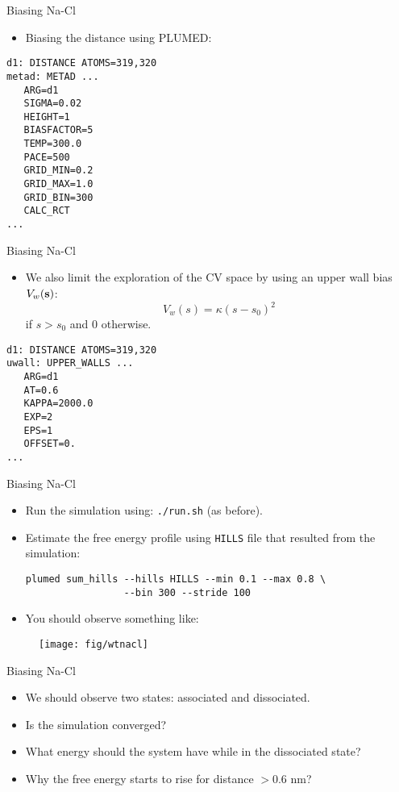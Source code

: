 \documentclass[10pt]{beamer}
\begin{document}
\begin{frame}[fragile]{Biasing Na-Cl}
\begin{itemize}
\setlength\itemsep{1em}
  \item Biasing the distance using PLUMED:
\end{itemize}
\begin{lstlisting}
d1: DISTANCE ATOMS=319,320
metad: METAD ...
   ARG=d1
   SIGMA=0.02
   HEIGHT=1
   BIASFACTOR=5
   TEMP=300.0
   PACE=500
   GRID_MIN=0.2
   GRID_MAX=1.0
   GRID_BIN=300
   CALC_RCT
...
\end{lstlisting}
\end{frame}

\begin{frame}[fragile]{Biasing Na-Cl}
\begin{itemize}
\setlength\itemsep{1em}
  \item We also limit the exploration of the CV space by using an upper wall bias $V_w({\bf s})$:
  \begin{equation}
    V_w(s)=\kappa(s-s_0)^2
  \end{equation}
  if $s>s_0$ and 0 otherwise.
\end{itemize}
\begin{lstlisting}
d1: DISTANCE ATOMS=319,320
uwall: UPPER_WALLS ...
   ARG=d1
   AT=0.6
   KAPPA=2000.0
   EXP=2
   EPS=1
   OFFSET=0.
...
\end{lstlisting}
\end{frame}

\begin{frame}[fragile]{Biasing Na-Cl}
\begin{itemize}
\setlength\itemsep{1em}
  \item Run the simulation using: \texttt{./run.sh} (as before).
  \item Estimate the free energy profile using \texttt{HILLS} file that resulted from the simulation:
  \begin{lstlisting}
plumed sum_hills --hills HILLS --min 0.1 --max 0.8 \
                 --bin 300 --stride 100
  \end{lstlisting}
  \item You should observe something like:
\end{itemize}
  \begin{figure}
    \texttt{[image: fig/wtnacl]}
  \end{figure}
\end{frame}

\begin{frame}[fragile]{Biasing Na-Cl}
\begin{itemize}
\setlength\itemsep{1em}
  \item We should observe two states: associated and dissociated.

  \item Is the simulation converged?

  \item What energy should the system have while in the dissociated state?

  \item Why the free energy starts to rise for distance $>0.6$ nm?
\end{itemize}
\end{frame}
\end{document}

